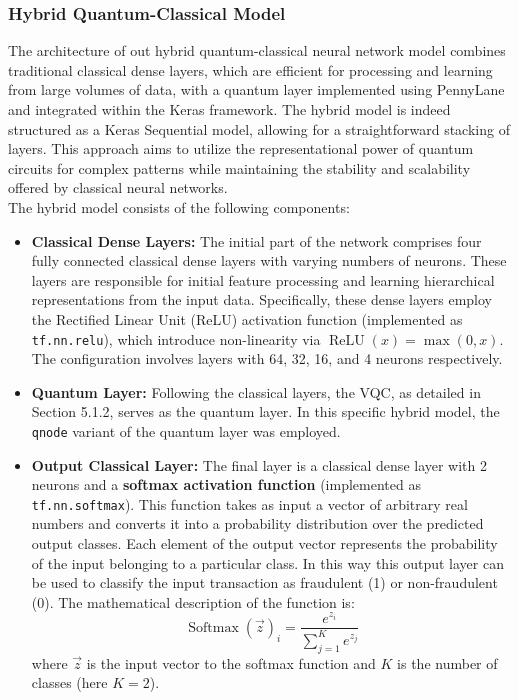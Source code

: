 \documentclass[10pt]{article}
\begin{document}
\subsubsection{Hybrid Quantum-Classical Model}
The architecture of out hybrid quantum-classical neural network model combines traditional classical dense layers, which are efficient for processing and learning from large volumes of data, with a quantum layer implemented using PennyLane and integrated within the Keras framework. The hybrid model is indeed structured as a Keras Sequential model, allowing for a straightforward stacking of layers. 
This approach aims to utilize the representational power of quantum circuits for complex patterns while maintaining the stability and scalability offered by classical neural networks. \\
The hybrid model consists of the following components:
\begin{itemize}
    \item \textbf{Classical Dense Layers:} The initial part of the network comprises four fully connected classical dense layers with varying numbers of neurons. These layers are responsible for initial feature processing and learning hierarchical representations from the input data. Specifically, these dense layers employ the Rectified Linear Unit (ReLU) activation function (implemented as \texttt{tf.nn.relu}), which introduce non-linearity via $\operatorname{ReLU}(x) = \max(0, x)$. The configuration involves layers with 64, 32, 16, and 4 neurons respectively.
    \item \textbf{Quantum Layer:} Following the classical layers, the VQC, as detailed in Section 5.1.2, serves as the quantum layer. In this specific hybrid model, the \texttt{qnode} variant of the quantum layer was employed.
    \item \textbf{Output Classical Layer:} The final layer is a classical dense layer with 2 neurons and a \textbf{softmax activation function} (implemented as \texttt{tf.nn.softmax}). This function takes as input a vector of arbitrary real numbers and converts it into a probability distribution over the predicted output classes. Each element of the output vector represents the probability of the input belonging to a particular class. In this way this output layer can be used to classify the input transaction as fraudulent (1) or non-fraudulent (0). The mathematical description of the function is: 
    $$ \operatorname{Softmax}(\vec{z})_i = \frac{e^{z_i}}{\sum_{j=1}^{K} e^{z_j}} $$ where $\vec{z}$ is the input vector to the softmax function and $K$ is the number of classes (here $K=2$).
\end{itemize}
\end{document}
